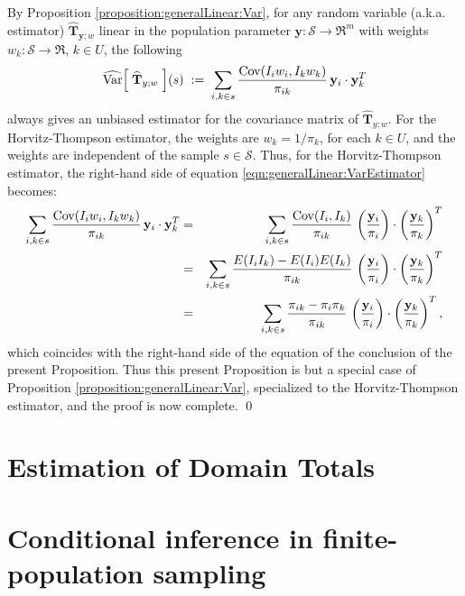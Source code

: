 \documentclass{article}
\begin{document}
\proof
By Proposition \ref{proposition:generalLinear:Var},
for any random variable (a.k.a. estimator) $\widehat{\mathbf{T}}_{\mathbf{y};w}$
linear in the population parameter $\mathbf{y} : \mathcal{S} \longrightarrow \Re^{m}$
with weights $w_{k} : \mathcal{S} \longrightarrow \Re$, $k \in U$, the following
\begin{equation}
\label{eqn:generalLinear:VarEstimator}
\widehat{\textnormal{Var}}\!\left[\;\widehat{\mathbf{T}}_{y;w}\;\right]\!(s)
\;:=\; \sum_{i,k \in s}\dfrac{\textnormal{Cov}(I_{i}w_{i},I_{k}w_{k})}{\pi_{ik}}\,\mathbf{y}_{i}\cdot\mathbf{y}_{k}^{T}
\end{equation}
always gives an unbiased estimator for the covariance matrix of $\widehat{\mathbf{T}}_{y;w}$.
For the Horvitz-Thompson estimator, the weights are $w_{k} = 1/\pi_{k}$, for each $k \in U$,
and the weights are independent of the sample $s \in \mathcal{S}$.
Thus, for the Horvitz-Thompson estimator, the right-hand side of equation
\eqref{eqn:generalLinear:VarEstimator} becomes:
\begin{eqnarray*}
\sum_{i,k \in s}\dfrac{\textnormal{Cov}(I_{i}w_{i},I_{k}w_{k})}{\pi_{ik}}\,\mathbf{y}_{i}\cdot\mathbf{y}_{k}^{T}
&=&\sum_{i,k \in s}\dfrac{\textnormal{Cov}(I_{i},I_{k})}{\pi_{ik}}\,\left(\dfrac{\mathbf{y}_{i}}{\pi_{i}}\right)\cdot\left(\dfrac{\mathbf{y}_{k}}{\pi_{k}}\right)^{T} \\
&=&\sum_{i,k \in s}\dfrac{E(I_{i}I_{k})-E(I_{i})E(I_{k})}{\pi_{ik}}\,\left(\dfrac{\mathbf{y}_{i}}{\pi_{i}}\right)\cdot\left(\dfrac{\mathbf{y}_{k}}{\pi_{k}}\right)^{T} \\
&=&\sum_{i,k \in s}\dfrac{\pi_{ik}-\pi_{i}\pi_{k}}{\pi_{ik}}\,\left(\dfrac{\mathbf{y}_{i}}{\pi_{i}}\right)\cdot\left(\dfrac{\mathbf{y}_{k}}{\pi_{k}}\right)^{T},
\end{eqnarray*}
which coincides with the right-hand side of the equation of the conclusion of the present Proposition.
Thus this present Proposition is but a special case of Proposition \ref{proposition:generalLinear:Var},
specialized to the Horvitz-Thompson estimator, and the proof is now complete. \qed


\section{Estimation of Domain Totals}
\setcounter{theorem}{0}


\section{Conditional inference in finite-population sampling}
\setcounter{theorem}{0}
\end{document}
